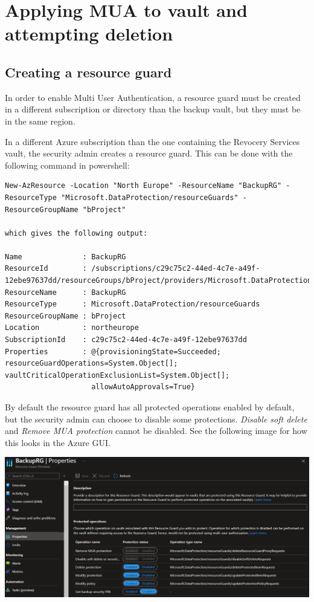 \section{Applying MUA to vault and attempting deletion}

\subsection{Creating a resource guard}\label{MUA}
In order to enable Multi User Authentication, a resource guard must be created in a different subscription or directory than the backup vault, but they must be in the same region.

In a different Azure subscription than the one containing the Revocery Services vault, the security admin creates a resource guard. This can be done with the following command in powershell: 

\begin{verbatim}
New-AzResource -Location "North Europe" -ResourceName "BackupRG" -ResourceType "Microsoft.DataProtection/resourceGuards" -ResourceGroupName "bProject"

which gives the following output:

Name              : BackupRG
ResourceId        : /subscriptions/c29c75c2-44ed-4c7e-a49f-12ebe97637dd/resourceGroups/bProject/providers/Microsoft.DataProtection/resourceGuards/BackupRG
ResourceName      : BackupRG
ResourceType      : Microsoft.DataProtection/resourceGuards
ResourceGroupName : bProject
Location          : northeurope
SubscriptionId    : c29c75c2-44ed-4c7e-a49f-12ebe97637dd
Properties        : @{provisioningState=Succeeded; resourceGuardOperations=System.Object[]; vaultCriticalOperationExclusionList=System.Object[]; 
                    allowAutoApprovals=True}
\end{verbatim}

By default the resource guard has all protected operations enabled by default, but the security admin can choose to disable some protections. \textit{Disable soft delete} and \textit{Remove MUA protection} cannot be disabled. See the following image for how this looks in the Azure GUI. 

\includegraphics[width=.9\linewidth]{figures/RG-properties.PNG}

